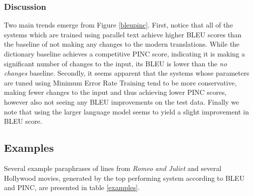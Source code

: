 \documentclass[10pt,a5paper,twoside]{article}
\begin{document}
\subsubsection{Discussion}
Two main trends emerge from Figure \ref{bleupinc}.  First, notice that all of the systems which are trained using parallel text achieve higher BLEU scores than the baseline
of not making any changes to the modern translations.  While the dictionary baseline achieves a competitive PINC score, indicating it is making a significant number of changes to the 
input, its BLEU is lower than the \emph{no changes} baseline.  Secondly, it seems apparent that the systems whose parameters are tuned using Minimum Error Rate Training \cite{MERT}
tend to be more conservative, making fewer changes to the input and thus achieving lower PINC scores, however also not seeing any BLEU improvements on the test data.  Finally
we note that using the larger language model seems to yield a slight improvement in BLEU score.

\subsection{Examples}
Several example paraphrases of lines from {\em Romeo and Juliet} and several Hollywood movies, generated by the top performing system according to BLEU and PINC, are presented in table \ref{examples}.
\end{document}
